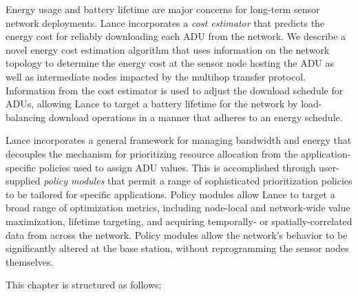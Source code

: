 Energy usage and battery lifetime are major concerns for long-term sensor
network deployments. Lance incorporates a \textit{cost estimator} that
predicts the energy cost for reliably downloading each ADU from the network.
We describe a novel energy cost estimation algorithm that uses information on
the network topology to determine the energy cost at the sensor node hosting
the ADU as well as intermediate nodes impacted by the multihop transfer
protocol. Information from the cost estimator is used to adjust the download
schedule for ADUs, allowing Lance to target a battery lifetime for the
network by load-balancing download operations in a manner that adheres to an
energy schedule.

Lance incorporates a general framework for managing bandwidth and energy that
decouples the mechanism for prioritizing resource allocation from the
application-specific policies used to assign ADU values. This is accomplished
through user-supplied \textit{policy modules} that permit a range of
sophisticated prioritization policies to be tailored for specific
applications. Policy modules allow Lance to target a broad range of
optimization metrics, including node-local and network-wide value
maximization, lifetime targeting, and acquiring temporally- or
spatially-correlated data from across the network. Policy modules allow the
network's behavior to be significantly altered at the base station, without
reprogramming the sensor nodes themselves.

This chapter is structured as follows:

